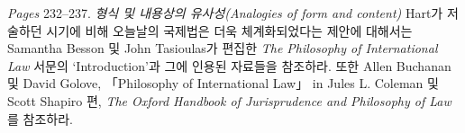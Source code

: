 {\emph{Pages} 232--237. \emph{형식 및 내용상의 유사성(Analogies of form
and content)} Hart가 저술하던 시기에 비해 오늘날의 국제법은 더욱
체계화되었다는 제안에 대해서는 Samantha Besson 및 John Tasioulas가
편집한 \emph{The Philosophy of International Law} 서문의
`Introduction'과 그에 인용된 자료들을 참조하라. 또한 Allen Buchanan 및
David Golove, 「Philosophy of International Law」 in Jules L. Coleman 및
Scott Shapiro 편, \emph{The Oxford Handbook of Jurisprudence and
Philosophy of Law}를 참조하라.

}